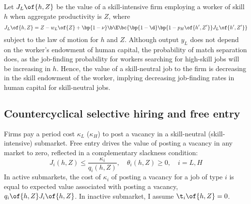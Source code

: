 \documentclass[12pt]{article}
\theoremstyle{definition}
\begin{document}
Let $J_L\of{h, Z}$ be the value of a skill-intensive firm employing a worker of skill $h$ when aggregate productivity is $Z$, where 
\begin{equation}
    \label{16}
    J_L\of{h, Z} = Z - w_L\of{Z} + \bp{1-\nu} \b \E\bc{\bp{1-\d} \bp{1 - p_H\of{h^{\prime}, Z^{\prime}}} J_L\of{h^{\prime}, Z^{\prime}}}
\end{equation}
subject to the law of motion for $h$ and $Z$. Although output $y_L$ does not depend on the  worker's endowment of human capital, the probability of match separation does, as the job-finding probability for workers searching for high-skill jobs will be increasing in $h$. Hence, the value of a skill-neutral job to the firm is decreasing in the skill endowment of the worker, implying decreasing job-finding rates in human capital for skill-neutral jobs.

\subsection{Countercyclical selective hiring and free entry}

Firms pay a period cost $\kappa_L$ ($\kappa_H$) to post a vacancy in a skill-neutral (skill-intensive) submarket. Free entry drives the value of posting a vacancy in any market to zero, reflected in a complementary slackness condition:
\begin{equation}
    \label{17}
    J_i(h, Z) \leq \frac{\kappa_i}{q_i(h, Z)},\quad \theta_i(h, Z) \geq 0, \quad i=L, H
\end{equation}In active submarkets, the cost of $\kappa_i$ of posting a vacancy for a job of type $i$ is equal to expected value associated with posting a vacancy, $q_i\of{h, Z} J_i\of{h, Z}$. In inactive submarket, I assume $\t_i\of{h, Z} = 0$. 
\end{document}
